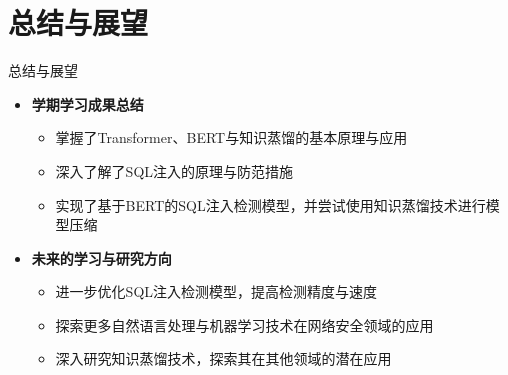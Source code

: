 \documentclass{beamer}
\begin{document}
\section{总结与展望}
\begin{frame}{总结与展望}
\begin{itemize}
    \item \textbf{学期学习成果总结}
        \begin{itemize}
            \item 掌握了Transformer、BERT与知识蒸馏的基本原理与应用
            \item 深入了解了SQL注入的原理与防范措施
            \item 实现了基于BERT的SQL注入检测模型，并尝试使用知识蒸馏技术进行模型压缩
        \end{itemize}
    \item \textbf{未来的学习与研究方向}
        \begin{itemize}
            \item 进一步优化SQL注入检测模型，提高检测精度与速度
            \item 探索更多自然语言处理与机器学习技术在网络安全领域的应用
            \item 深入研究知识蒸馏技术，探索其在其他领域的潜在应用
        \end{itemize}
\end{itemize}
\end{frame}
 
\end{document}
